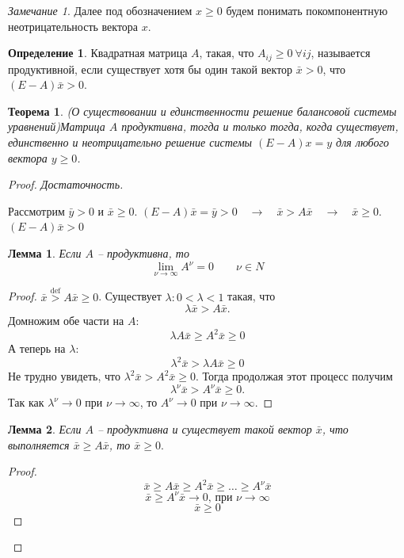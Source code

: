\documentclass[12pt,a4paper,titlepage,oneside]{book}
\theoremstyle{definition}
\newtheorem{definition}{Определение}[chapter]
\theoremstyle{plain}
\newtheorem{theorem}{Теорема}[chapter]
\theoremstyle{remark}
\newtheorem{remark}{Замечание}[chapter]
\theoremstyle{remark}
\theoremstyle{plain}
\newtheorem{lemma}{Лемма}[chapter]
\theoremstyle{plain}
\begin{document}
\begin{remark}
Далее под обозначением $x \geq 0$ будем понимать покомпонентную неотрицательность вектора $x$.
\end{remark}
\begin{definition}
Квадратная матрица $A$, такая, что $A_{ij} \geq 0 \: \forall i j$, называется продуктивной, если существует хотя бы один такой вектор $\bar{x} > 0$, что $(E-A)\bar{x} > 0$.
\end{definition}
\begin{theorem}(О существовании и единственности решение балансовой системы уравнений)\label{t1.1}
Матрица $A$ продуктивна, тогда и только тогда, когда существует, единственно и неотрицательно решение системы $(E-A)x=y$ для любого  вектора $y \geq 0$.
\end{theorem}
\begin{proof}
\textit{Достаточность.}

Рассмотрим $\bar{y} > 0$ и $\bar{x} \geq 0$. $(E-A)\bar{x} = \bar{y} > 0 \quad \rightarrow \quad \bar{x} > A\bar{x} \quad \rightarrow \quad \bar{x} \geq 0$. $(E-A)\bar{x} > 0$ 
\begin{lemma}\label{l1.1}
Если $A$ -- продуктивна, то
$$\lim_{\nu \to \infty} A^{\nu} = 0 \qquad \nu \in N$$

\end{lemma}
\begin{proof}
$ \bar{x} \overset{\mathrm{def}}{>} A \bar{x} \geq 0$. Существует $\lambda : 0 < \lambda < 1$ такая, что $$\lambda \bar{x} > A\bar{x}.$$ 
Домножим обе части на $A$:
$$\lambda A \bar{x} \geq A^2 \bar{x} \geq 0$$
А теперь на $\lambda$:
$$ \lambda^2 \bar{x} > \lambda A \bar{x} \geq 0$$
Не трудно увидеть, что $\lambda^2 \bar{x} > A^2 \bar{x} \geq 0$. Тогда продолжая этот процесс получим 
$$\lambda^{\nu} \bar{x} > A^{\nu} \bar{x} \geq 0.$$
Так как $\lambda^{\nu} \to 0$ при $ \nu \to \infty$, то $A^{\nu} \to 0 $ при $ \nu \to \infty.$
\end{proof}

\begin{lemma}\label{l1.2}
Если $A$ -- продуктивна и существует такой вектор $\bar{x}$, что выполняется $\bar{x} \geq A\bar{x}$, то $\bar{x} \geq 0.$
\end{lemma}
\begin{proof}

$$\bar{x} \geq A\bar{x} \geq A^2\bar{x} \geq \dots \geq A^{\nu} \bar{x}$$
$$\bar{x} \geq A^{\nu} \bar{x} \to 0 \text{, при } \nu \to \infty$$
$$\bar{x} \geq 0$$
\end{proof}


\end{proof}
\end{document}
